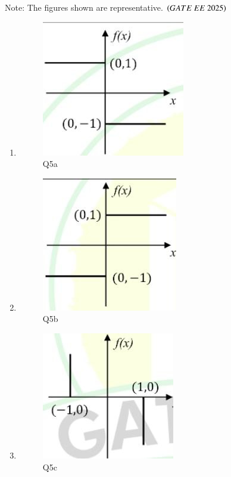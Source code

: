 \documentclass[journal,12pt,onecolumn]{IEEEtran}
\theoremstyle{remark}
\begin{document}
\begin{enumerate}
  Note: The figures shown are representative.  
\hfill $\left(GATE\ EE\ 2025\right)$
  \begin{multicols}{4}
  \begin{enumerate}
    \item \begin{figure}[H]
\centering
\caption{Q5a}
\label{Q5a}
\includegraphics[scale=0.5]{figs/Q5a.jpg}
\end{figure}
    \item \begin{figure}[H]
\centering
\caption{Q5b}
\label{Q5b}
\includegraphics[scale=0.5]{figs/Q5b.jpg}
\end{figure}
    \item \begin{figure}[H]
\centering
\caption{Q5c}
\label{Q5c}
\includegraphics[scale=0.5]{figs/Q5c.jpg}
\end{figure}

\end{enumerate}
\end{multicols}
\end{enumerate}
\end{document}
